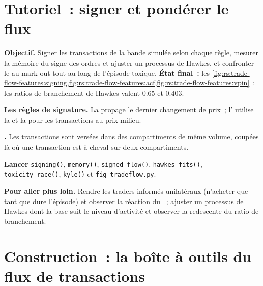 \section{Tutoriel~: signer et pondérer le flux}\label{tut:rs:trade-flow-features:flow}

\begin{tutorial}
\textbf{Objectif.} Signer les transactions de la bande simulée selon chaque règle, mesurer la mémoire du signe des ordres et ajuster un processus de Hawkes, et confronter le 
au mark-out tout au long de l'épisode toxique. \textbf{État final~:}
les \cref{fig:rs:trade-flow-features:signing,fig:rs:trade-flow-features:acf,fig:rs:trade-flow-features:vpin}~; les ratios de branchement de Hawkes valent 0.65
et 0.403.
\begin{tutsteps}
\item \textbf{Les règles de signature.} La  propage le dernier changement de prix~; l' utilise la  et la  pour
les transactions au prix milieu.
\label{lst:rs:trade-flow-features:rules}
\item \textbf{.} Les transactions sont versées dans des compartiments de même volume, coupées là où une transaction est à cheval sur deux compartiments.
\label{lst:rs:trade-flow-features:vpincode}
\item \textbf{Lancer} \texttt{signing()}, \texttt{memory()}, \texttt{signed\_flow()}, \texttt{hawkes\_fits()}, \texttt{toxicity\_race()}, \texttt{kyle()} et
\texttt{fig\_tradeflow.py}.
\end{tutsteps}
\textbf{Pour aller plus loin.} Rendre les traders informés unilatéraux (n'acheter que tant que dure l'épisode) et observer la réaction du ~; ajuster un processus de
Hawkes dont la base suit le niveau d'activité et observer la redescente du ratio de branchement.
\end{tutorial}

\section{Construction~: la boîte à outils du flux de transactions}\label{bld:rs:trade-flow-features:tradeflow}

